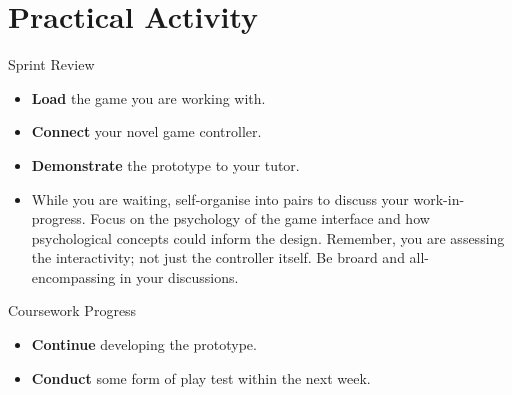 \documentclass[xcolor={dvipsnames}]{beamer}\usepackage{etoolbox}\newtoggle{printable}\togglefalse{printable}
\begin{document}
\part{Practical Activity}
\frame{\partpage}

\begin{frame}{Sprint Review}
	\begin{itemize}
		\item \textbf{Load} the game you are working with.
		\item \textbf{Connect} your novel game controller.
		\item \textbf{Demonstrate} the prototype to your tutor.
		\item While you are waiting, self-organise into pairs to discuss your work-in-progress. Focus on the psychology
		of the game interface and how psychological concepts could inform the design. Remember, you are assessing the interactivity; 
		not just the controller itself. Be broard and all-encompassing in your discussions.
	\end{itemize}
\end{frame}

\begin{frame}{Coursework Progress}
	\begin{itemize}
		\item \textbf{Continue} developing the prototype.
		\item \textbf{Conduct} some form of play test within the next week.
	\end{itemize}
\end{frame}


%
\end{document}
